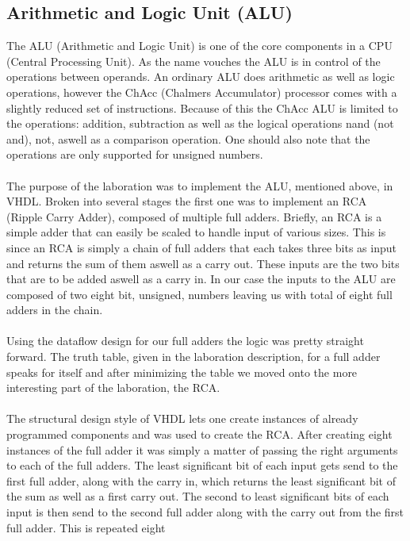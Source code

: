 \documentclass[a4paper,11pt]{article}
\begin{document}
\subsection{Arithmetic and Logic Unit (ALU)}
The ALU (Arithmetic and Logic Unit) is one of the core components in a CPU 
(Central Processing Unit). As the name vouches the ALU is in control of the 
operations between operands. An ordinary ALU does arithmetic as well as logic 
operations, however the ChAcc (Chalmers Accumulator) processor comes with a 
slightly reduced set of instructions. Because of this the ChAcc ALU is limited 
to the operations: addition, subtraction as well as the logical operations nand 
(not and), not, aswell as a comparison operation. One should also note that 
the operations are only supported for unsigned numbers.\\\\
\noindent
The purpose of the laboration was to implement the ALU, mentioned above, in 
VHDL. Broken into several stages the first one was to implement an RCA (Ripple 
Carry Adder), composed of multiple full adders. Briefly, an RCA is a simple 
adder that can easily be scaled to handle input of various sizes. This is since 
an RCA is simply a chain of full adders that each takes three bits as input 
and returns the sum of them aswell as a carry out. These inputs are the two 
bits that are to be added aswell as a carry in. In our case the inputs to the 
ALU are composed of two eight bit, unsigned, numbers leaving us with total 
of eight full adders in the chain.\\\\
\noindent
Using the dataflow design for our full adders the logic was pretty straight 
forward. The truth table, given in the laboration description, for a full 
adder speaks for itself and after minimizing the table we moved onto the more 
interesting part of the laboration, the RCA.\\\\
\noindent
The structural design style of VHDL lets one create instances of already 
programmed components and was used to create the RCA. After creating eight 
instances of the full adder it was simply a matter of passing the right 
arguments to each of the full adders. The least significant bit of each input 
gets send to the first full adder, along with the carry in, which returns the 
least significant bit of the sum as well as a first carry out. The second to 
least significant bits of each input is then send to the second full adder 
along with the carry out from the first full adder. This is repeated eight 
\end{document}
